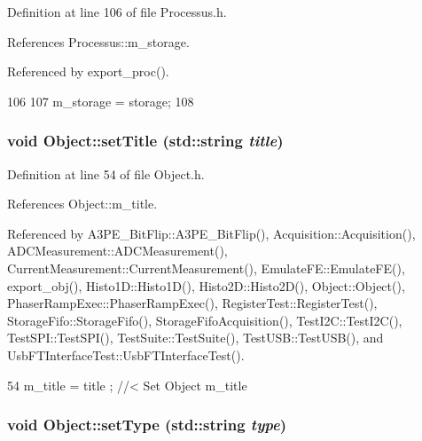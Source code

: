 Definition at line 106 of file Processus.h.

References Processus::m\_\-storage.

Referenced by export\_\-proc().


\begin{DoxyCode}
106                                       {
107     m_storage = storage;
108   }
\end{DoxyCode}
\hypertarget{classObject_a89557dbbad5bcaa02652f5d7fa35d20f}{
\subsubsection[{setTitle}]{\setlength{\rightskip}{0pt plus 5cm}void Object::setTitle (std::string {\em title})}}
\label{classObject_a89557dbbad5bcaa02652f5d7fa35d20f}


Definition at line 54 of file Object.h.

References Object::m\_\-title.

Referenced by A3PE\_\-BitFlip::A3PE\_\-BitFlip(), Acquisition::Acquisition(), ADCMeasurement::ADCMeasurement(), CurrentMeasurement::CurrentMeasurement(), EmulateFE::EmulateFE(), export\_\-obj(), Histo1D::Histo1D(), Histo2D::Histo2D(), Object::Object(), PhaserRampExec::PhaserRampExec(), RegisterTest::RegisterTest(), StorageFifo::StorageFifo(), StorageFifoAcquisition(), TestI2C::TestI2C(), TestSPI::TestSPI(), TestSuite::TestSuite(), TestUSB::TestUSB(), and UsbFTInterfaceTest::UsbFTInterfaceTest().


\begin{DoxyCode}
54 { m_title = title ; } //< Set Object m_title
\end{DoxyCode}
\hypertarget{classObject_aae534cc9d982bcb9b99fd505f2e103a5}{
\subsubsection[{setType}]{\setlength{\rightskip}{0pt plus 5cm}void Object::setType (std::string {\em type})}}
\label{classObject_aae534cc9d982bcb9b99fd505f2e103a5}


